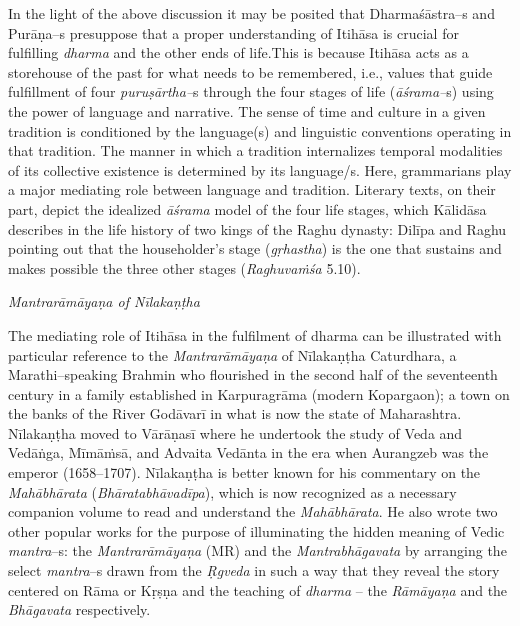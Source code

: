 In the light of the above discussion it may be posited that Dharmaśāstra–s and Purāṇa–s presuppose that a proper understanding of Itihāsa is crucial for fulfilling \textit{dharma} and the other ends of life.This is because Itihāsa acts as a storehouse of the past for what needs to be remembered, i.e., values that guide fulfillment of four \textit{puruṣārtha–}s through the four stages of life (\textit{āśrama–}s) using the power of language and narrative. The sense of time and culture in a given tradition is conditioned by the language(s) and linguistic conventions operating in that tradition. The manner in which a tradition internalizes temporal modalities of its collective existence is determined by its language/s. Here, grammarians play a major mediating role between language and tradition. Literary texts, on their part, depict the idealized \textit{āśrama} model of the four life stages, which Kālidāsa describes in the life history of two kings of the Raghu dynasty: Dilīpa and Raghu pointing out that the householder’s stage (\textit{gṛhastha}) is the one that sustains and makes possible the three other stages (\textit{Raghuvaṁśa} 5.10).

\textit{Mantrarāmāyaṇa of Nīlakaṇṭha }

The mediating role of Itihāsa in the fulfilment of dharma can be illustrated with particular reference to the \textit{Mantrarāmāyaṇa} of Nīlakaṇṭha Caturdhara, a Marathi–speaking Brahmin who flourished in the second half of the seventeenth century in a family established in Karpuragrāma (modern Kopargaon); a town on the banks of the River Godāvarī in what is now the state of Maharashtra. Nīlakaṇṭha moved to Vārāṇasī where he undertook the study of Veda and Vedāṅga, Mīmāṁsā, and Advaita Vedānta in the era when Aurangzeb was the emperor (1658–1707). Nīlakaṇṭha is better known for his commentary on the \textit{Mahābhārata} (\textit{Bhāratabhāvadīpa}), which is now recognized as a necessary companion volume to read and understand the \textit{Mahābhārata}. He also wrote two other popular works for the purpose of illuminating the hidden meaning of Vedic \textit{mantra}–s: the \textit{Mantrarāmāyaṇa} (MR) and the \textit{Mantrabhāgavata} by arranging the select \textit{mantra}–s drawn from the \textit{Ṛgveda} in such a way that they reveal the story centered on Rāma or Kṛṣṇa and the teaching of \textit{dharma} – the \textit{Rāmāyaṇa} and the \textit{Bhāgavata} respectively.

